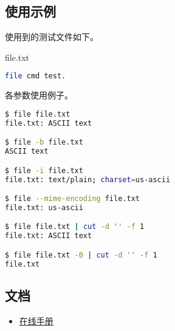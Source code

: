 \subsection{使用示例}
使用到的测试文件如下。

file.txt
\begin{lstlisting}[language=bash, numbersep=1em, numberstyle=\footnotesize , breaklines=true]
file cmd test.
\end{lstlisting}

各参数使用例子。
\begin{lstlisting}[language=bash, numbersep=1em, numberstyle=\footnotesize , breaklines=true]
$ file file.txt
file.txt: ASCII text

$ file -b file.txt
ASCII text

$ file -i file.txt
file.txt: text/plain; charset=us-ascii

$ file --mime-encoding file.txt
file.txt: us-ascii

$ file file.txt | cut -d '' -f 1
file.txt: ASCII text

$ file file.txt -0 | cut -d '' -f 1
file.txt
\end{lstlisting}


\subsection{文档}
\begin{itemize}
\item \href{https://man7.org/linux/man-pages/man1/file.1.html}{在线手册}
\end{itemize}
